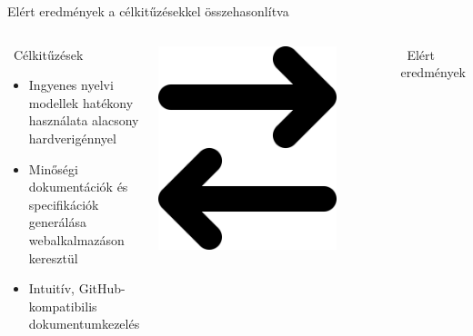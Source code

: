 \documentclass[11pt]{beamer}
\begin{document}
\begin{frame}{Elért eredmények a célkitűzésekkel összehasonlítva}
    \begin{columns}[T]
        \begin{block}{\faFlag~Célkitűzések}
          \small
          \begin{itemize}
            \vspace{0.5em}
            \item Ingyenes nyelvi modellek hatékony használata alacsony hardverigénnyel
            \vspace{0.5em}
            \item Minőségi dokumentációk és specifikációk generálása webalkalmazáson keresztül
            \vspace{0.5em}
            \item Intuitív, GitHub-kompatibilis dokumentumkezelés
            \vspace{0.5em}
          \end{itemize}
        \end{block}
        \vspace{8em}
        \centering
        \includegraphics[width=0.8\textwidth]{arrow-right-arrow-left-solid.png}
        \begin{block}{\faCheckCircle~Elért eredmények}
          \small
          \begin{itemize}

\end{itemize}
\end{block}
\end{columns}
\end{frame}
\end{document}
